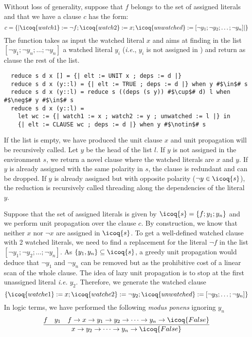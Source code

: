 \documentclass[utf8,a4paper,UKenglish,cleveref, autoref, thm-restate]{lipics-v2019}
\begin{document}
Without loss of generality, suppose that $f$ belongs to the set of assigned
literals  and that we have a clause $c$ has the form:
\[
  c = \{| \icoq{watch1} := \neg f ; \icoq{watch2} := x ; \icoq{unwatched} := [\neg y_1;\neg y_2;\dots;\neg y_n]|\}
\]
The  function takes as input the watched literal $x$ and aims at finding in the list
$[\neg y_1;\neg y_n;\dots;\neg y_n]$ a watched literal $y_i$ (\emph{i.e.}, $y_i$ is not assigned in )
and return as clause the rest of the
list. %
\begin{verbatim}
  reduce s d x [] = {| elt := UNIT x ; deps := d |}
  reduce s d x (y::l) = {| elt := TRUE ; deps := d |} when y #$\in$# s
  reduce s d x (y::l) = reduce s ((deps (s y)) #$\cup$# d) l when #$\neg$# y #$\in$# s
  reduce s d x (y::l) =
    let wc := {| watch1 := x ; watch2 := y ; unwatched := l |} in
    {| elt := CLAUSE wc ; deps := d |} when y #$\notin$# s
\end{verbatim}
If the list is empty, we have produced the unit clause $x$ and unit
propagation will be recursively called.  Let $y$ be the head of the list
$l$.  If $y$ is not assigned in the environment $s$, we return a
novel clause where the watched literals are $x$ and $y$.
%
If $y$ is already assigned with the same polarity in $s$, the clause
is redundant and can be dropped.  If $y$ is already assigned but with
opposite polarity ($\neg y \in \icoq{s}$), the reduction is recursively called threading along
the dependencies of the literal $y$.
%
\begin{example}
  Suppose that the set of assigned literals is given by
  $\icoq{s} = \{ f; y_1; y_n \}$ and we perform unit
  propagation over the clause $c$.  By construction, we know that
  neither $x$ nor $\neg x$ are assigned in $\icoq{s}$. To get a
  well-defined watched clause with 2 watched literals, we need to find
  a replacement for the literal $\neg f$ in the list
  $[\neg y_1;\neg y_2;\ldots;\neg y_n]$.
  As $\{y_1, y_n\} \subseteq  \icoq{s}$, a greedy unit propagation would deduce that
  $\neg y_1$ and $\neg y_n$ can be removed but as the prohibitive cost of a linear scan of the whole clause.
  The idea of lazy unit propagation is to stop at the first unassigned literal \emph{i.e.} $y_2$.
  Therefore, we generate the watched clause
  \[
    \{ \icoq{watche1} := x ; \icoq{watche2} := \neg y_2 ; \icoq{unwatched} := [\neg y_3;\dots;\neg y_n] \}
    \]
    In logic terms, we have performed the following \emph{modus ponens} ignoring $y_n$
    \[
      \dfrac{
        f \quad y_1 \quad f \to x \to y_1 \to y_2 \to \dots  \to y_n \to \icoq{False}
      }
      {  x \to y_2 \to \dots \to y_n \to \icoq{False} }
    \]
\end{example}
\end{document}
